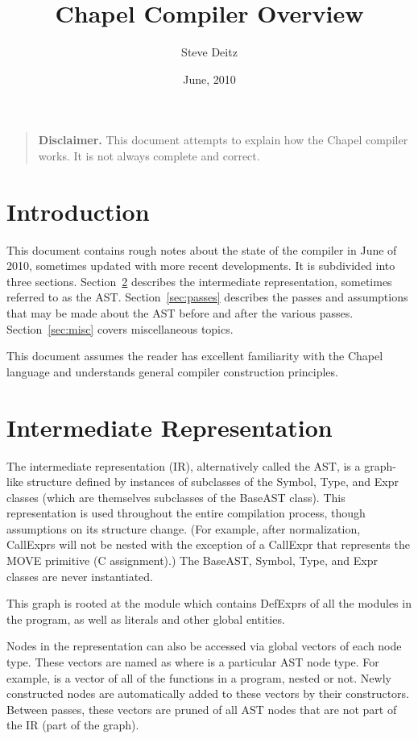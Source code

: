 \documentclass[10pt]{article}
\title{Chapel Compiler Overview}
\author{Steve Deitz}
\date{June, 2010}
\begin{document}
\maketitle

\begin{quote}
\footnotesize
{\bf Disclaimer.}  This document attempts to explain how the
Chapel compiler works.  It is not always complete and correct.
\end{quote}

{
  \footnotesize
  \tableofcontents
}

\section{Introduction}

This document contains rough notes about the state of the compiler in
June of 2010, sometimes updated with more recent developments.
It is subdivided into three sections.
Section~\ref{sec:ast} describes the intermediate representation,
sometimes referred to as the AST.  Section~\ref{sec:passes} describes
the passes and assumptions that may be made about the AST before and
after the various passes.  Section~\ref{sec:misc} covers miscellaneous
topics.

This document assumes the reader has excellent familiarity with the
Chapel language and understands general compiler construction principles.

\section{Intermediate Representation}
\label{sec:ast}

The intermediate representation (IR), alternatively called the AST, is
a graph-like structure defined by instances of subclasses of the
Symbol, Type, and Expr classes (which are themselves subclasses of the
BaseAST class).  This representation is used throughout the entire
compilation process, though assumptions on its structure change.  (For
example, after normalization, CallExprs will not be nested with the
exception of a CallExpr that represents the MOVE primitive (C
assignment).)  The BaseAST, Symbol, Type, and Expr classes are never
instantiated.

This graph is rooted at the module  which contains DefExprs
of all the modules in the program, as well as literals and other
global entities.

Nodes in the representation can also be accessed via global vectors of
each node type.  These vectors are named as  where 
is a particular AST node type.  For example,  is a
vector of all of the functions in a program, nested or not.  Newly
constructed nodes are automatically added to these vectors by their
constructors.  Between passes, these vectors are pruned of all AST
nodes that are not part of the IR (part of the graph).
\end{document}

